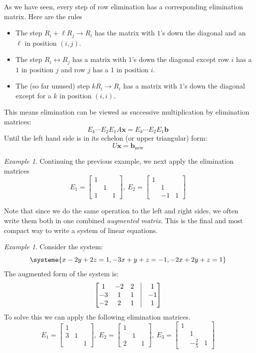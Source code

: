 \documentclass[11pt,oneside]{amsbook}
\theoremstyle{definition}
\theoremstyle{plain}
\theoremstyle{definition}
\theoremstyle{remark}
\newtheorem{example}[theorem]{Example}
\numberwithin{equation}{section}
\numberwithin{figure}{section}
\begin{document}
As we have seen, every step of row elimination has a corresponding elimination matrix. Here are the rules
\begin{itemize}
  \item The step $R_i+\ell R_j\to R_i$ has the matrix with $1$'s down the diagonal and an $\ell$ in position $(i,j)$.
  \item The step $R_i\leftrightarrow R_j$ has a matrix with $1$'s down the diagonal except row $i$ has a $1$ in position $j$ and row $j$ has a $1$ in position $i$.
  \item The (so far unused) step $kR_i\to R_i$ has a matrix with $1$'s down the diagonal except for a $k$ in position $(i,i)$.
\end{itemize}
This means elimination can be viewed as successive multiplication by elimination matrices:
\[E_k\cdots E_2E_1A\mathbf{x}=E_k\cdots E_2E_1\mathbf{b}
\]
Until the left hand side is in its echelon (or upper triangular) form:
\[U\mathbf{x}=\mathbf{b}_{\text{new}}
\]

\begin{example}
  Continuing the previous example, we next apply the elimination matrices
  \[E_1=\begin{bmatrix}1\\&1\\1&&1\end{bmatrix},\ 
    E_2=\begin{bmatrix}1\\&1\\&-1&1\end{bmatrix}
  \]
\end{example}

Note that since we do the same operation to the left and right sides, we often write them both in one combined \emph{augmented matrix}. This is the final and most compact way to write a system of linear equations. 

\begin{example}
  Consider the system:
  \[\systeme{x-2y+2z=1,-3x+y+z=-1,-2x+2y+z=1}
  \]
  The augmented form of the system is:
  \[\begin{bmatrix}
      1&-2&2&\vline&1\\
      -3&1&1&\vline&-1\\
      -2&2&1&\vline&1
    \end{bmatrix}
  \]
  To solve this we can apply the following elimination matrices.
  \[E_1=\begin{bmatrix}1\\3&1\\&&1\end{bmatrix},\ 
    E_2=\begin{bmatrix}1\\&1\\2&&1\end{bmatrix},\ 
    E_3=\begin{bmatrix}1\\&1\\&-\frac25&1\end{bmatrix}
  \]
\end{example}
\end{document}
